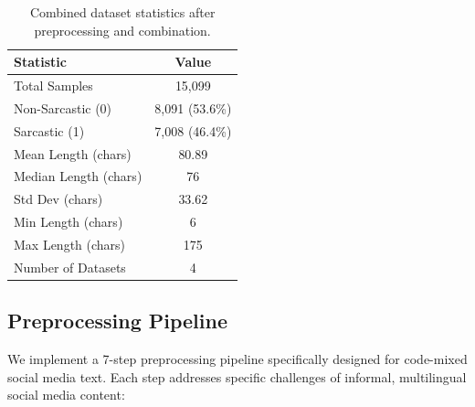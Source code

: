 \documentclass[11pt]{article}
\begin{document}
\begin{table}[h]
\centering
\small
\begin{tabular}{lc}
\toprule
\textbf{Statistic} & \textbf{Value} \\
\midrule
Total Samples & 15,099 \\
Non-Sarcastic (0) & 8,091 (53.6\%) \\
Sarcastic (1) & 7,008 (46.4\%) \\
Mean Length (chars) & 80.89 \\
Median Length (chars) & 76 \\
Std Dev (chars) & 33.62 \\
Min Length (chars) & 6 \\
Max Length (chars) & 175 \\
Number of Datasets & 4 \\
\bottomrule
\end{tabular}
\caption{Combined dataset statistics after preprocessing and combination.}
\label{tab:dataset_stats}
\end{table}

\subsection{Preprocessing Pipeline}

We implement a 7-step preprocessing pipeline specifically designed for code-mixed social media text. Each step addresses specific challenges of informal, multilingual social media content:
\end{document}
